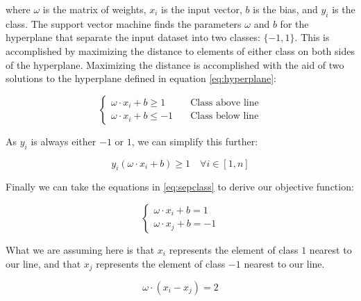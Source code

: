 \documentclass{comjnl}
\numberwithin{equation}{subsection}
\begin{document}
            \noindent where $\omega$ is the matrix of weights, $x_i$ is the input vector, $b$ is the
            bias, and $y_i$ is the class. The support vector machine finds the parameters $\omega$ and $b$ for the
            hyperplane that separate the input dataset into two classes: $\{-1,1\}$. This is accomplished by
            maximizing the distance to elements of either class on both sides of the hyperplane. Maximizing
            the distance is accomplished with the aid of two solutions to the hyperplane defined in
            equation \eqref{eq:hyperplane}:

            \begin{equation}\label{eq:sepclass}
                \begin{cases}
                    \omega \cdot x_i + b \geq 1 & \quad \text{Class above line} \\
                    \omega \cdot x_i + b \leq -1 & \quad \text{Class below line}
                \end{cases}
            \end{equation}

            \noindent As $y_i$ is always either $-1$ or $1$, we can simplify this further:

            \begin{equation}\label{eq:bothclass}
                y_i(\omega \cdot x_i + b) \geq 1 \quad \forall i \in [1,n]
            \end{equation}

            \noindent Finally we can take the equations in \eqref{eq:sepclass} to derive our
            objective function:

            \begin{equation*}
                \begin{cases}
                    \omega \cdot x_i + b = 1 \\
                    \omega \cdot x_j + b = -1
                \end{cases}
            \end{equation*}

            \noindent What we are assuming here is that $x_i$ represents the element of class $1$
            nearest to our line, and that $x_j$ represents the element of class $-1$ nearest to our
            line.

            \begin{equation*}
                \omega \cdot (x_i-x_j) = 2
            \end{equation*}
\end{document}
